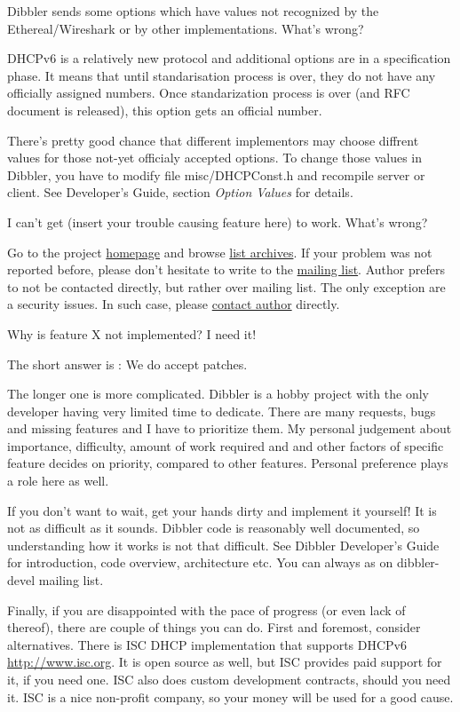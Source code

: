 \Q Dibbler sends some options which have values not recognized by the
Ethereal/Wireshark or by other implementations. What's wrong?

\A DHCPv6 is a relatively new protocol and additional options are in a
specification phase. It means that until standarisation process is
over, they do not have any officially assigned numbers. Once
standarization process is over (and RFC document is released), this
option gets an official number.

There's pretty good chance that different implementors may choose
diffrent values for those not-yet officialy accepted options. To
change those values in Dibbler, you have to modify file
misc/DHCPConst.h and recompile server or client. See Developer's
Guide, section \emph{Option Values} for details.

\Q I can't get (insert your trouble causing feature here) to
work. What's wrong?

\A Go to the project \href{http://klub.com.pl/dhcpv6/}{homepage} and
browse \href{http://klub.com.pl/lists/dibbler/}{list archives}. If
your problem was not reported before, please don't hesitate to write
to the
\href{http://klub.com.pl/cgi-bin/mailman/listinfo/dibbler}{mailing
  list}. Author prefers to not be contacted directly, but rather
over mailing list. The only exception are a security issues. In such
case, please \href{mailto:thomson(at)klub.com.pl}{contact author}
directly.

\Q Why is feature X not implemented? I need it!

\Q The short answer is : We do accept patches.

The longer one is more complicated. Dibbler is a hobby project with
the only developer having very limited time to dedicate. There are
many requests, bugs and missing features and I have to prioritize
them. My personal judgement about importance, difficulty, amount of
work required and and other factors of specific feature decides on
priority, compared to other features. Personal preference plays a role
here as well.

If you don't want to wait, get your hands dirty and implement it
yourself! It is not as difficult as it sounds. Dibbler code is
reasonably well documented, so understanding how it works is not that
difficult. See Dibbler Developer's Guide for introduction, code
overview, architecture etc. You can always as on dibbler-devel mailing
list.

Finally, if you are disappointed with the pace of progress (or even
lack of thereof), there are couple of things you can do. First and
foremost, consider alternatives. There is ISC DHCP implementation that
supports DHCPv6 \href{http://www.isc.org/software/dhcp}{http://www.isc.org}.
It is open source as well, but ISC provides paid support for it, if
you need one. ISC also does custom development contracts, should you
need it. ISC is a nice non-profit company, so your money will be used
for a good cause.

